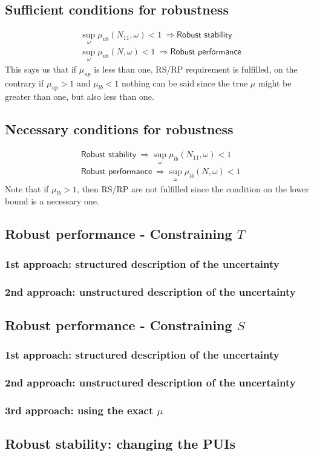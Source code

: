 \documentclass[a4paper, 12pt]{article}
\begin{document}
\subsection{Sufficient conditions for robustness}
\begin{align}
    &\sup_\omega \mu_{ub}(N_{11},\omega) < 1 \ \Longrightarrow \textsf{Robust stability}\\
    & \sup_\omega \mu_{ub}(N,\omega) < 1 \ \Longrightarrow \textsf{Robust performance}
\end{align}
This says us that if $\mu_{up}$ is less than one, RS/RP requirement is fulfilled, on the contrary if $\mu_{up}>1$ and $\mu_{lb}<1$ nothing can be said since the true $\mu$ might be greater than one, but also less than one.

\subsection{Necessary conditions for robustness}
\begin{align}
    &\textsf{Robust stability} \ \Longrightarrow  \sup_\omega \mu_{lb}(N_{11},\omega) < 1\\
    &  \textsf{Robust performance} \ \Longrightarrow \sup_\omega \mu_{lb}(N,\omega) < 1 
\end{align}
Note that if $\mu_{lb} > 1$, then RS/RP are not fulfilled since the condition on the lower bound is a necessary one.

\subsection{Robust performance - Constraining $T$}

\subsubsection{1st approach: structured description of the uncertainty}
\subsubsection{2nd approach: unstructured description of the uncertainty}

\subsection{Robust performance - Constraining $S$}
\subsubsection{1st approach: structured description of the uncertainty}
\subsubsection{2nd approach: unstructured description of the uncertainty}
\subsubsection{3rd approach: using the exact $\mu$}

\subsection{Robust stability: changing the PUIs}
\end{document}
